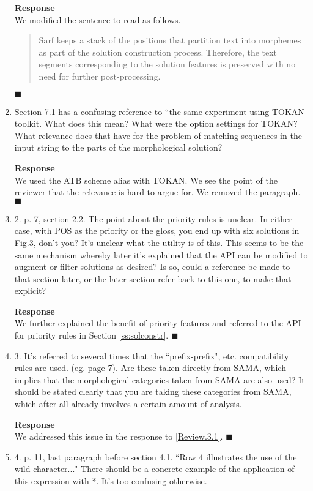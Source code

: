 \begin{enumerate}[leftmargin=0mm,label=\bfseries CommentR3.\arabic*]
\textbf{Response}\\
We modified the sentence to read as follows. 

\blockquote{
Sarf keeps a stack of the positions that partition text into morphemes
as part of the solution construction process. 
Therefore, the text segments corresponding to the solution features is preserved
with no need for further post-processing. }
$\blacksquare$

\item \label{Review.3.7}
Section 7.1 has a confusing reference to ``the same experiment using TOKAN toolkit. What does this mean?  What were the option settings for TOKAN?  What relevance does that have for the problem of matching sequences in the input string to the parts of the morphological solution?

\textbf{Response}\\
We used the ATB scheme alias with TOKAN. We see the point of the reviewer that the relevance is hard to argue for. 
We removed the paragraph.
$\blacksquare$

\item \label{Review.3.8}
2. p. 7, section 2.2. The point about the priority rules is unclear. In either case, with POS as the priority or the gloss, you end up with six solutions in Fig.3, don't you?  It's unclear what the utility is of this.  This seems to be the same mechanism whereby later it's explained that the API can be modified to augment or filter solutions as desired?  Is so, could a reference be made to that section later, or the later section refer back to this one, to make that explicit?

\textbf{Response}\\
We further explained the benefit of priority features and referred to the API for priority rules in Section \ref{ss:solconstr}. 
$\blacksquare$

\item \label{Review.3.9}
3. It's referred to several times that the ``prefix-prefix", etc. compatibility rules are used. (eg. page 7).  
Are these taken directly from SAMA, which implies that the morphological categories taken from SAMA are also used?  
It should be stated clearly that you are taking these categories from SAMA, which after all already involves a 
certain amount of analysis.

\textbf{Response}\\
We addressed this issue in the response to \ref{Review.3.1}.
$\blacksquare$
\item \label{Review.3.10}
4. p. 11, last paragraph before section 4.1. ``Row 4 illustrates the use of the wild character..."  There should be a concrete example of the application of this expression with *.  It's too confusing otherwise.


\end{enumerate}
